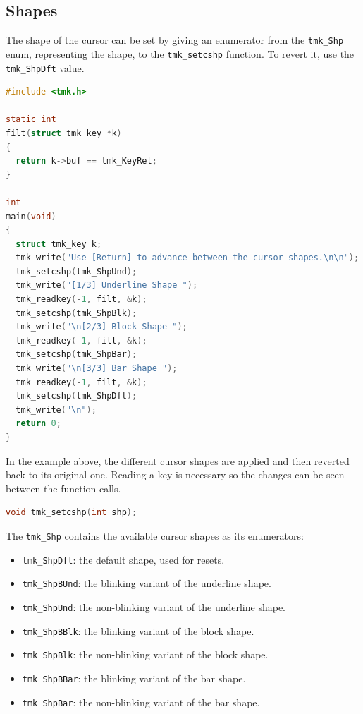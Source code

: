 \documentclass{report}
\begin{document}
\subsection{Shapes}
The shape of the cursor can be set by giving an enumerator from the \texttt{tmk\_Shp} enum, representing the shape, to the \texttt{tmk\_setcshp} function. To revert it, use the \texttt{tmk\_ShpDft} value.
\begin{lstlisting}[language=c,caption=an example that sets cursor shapes.]
#include <tmk.h>

static int
filt(struct tmk_key *k)
{
  return k->buf == tmk_KeyRet;
}

int
main(void)
{
  struct tmk_key k;
  tmk_write("Use [Return] to advance between the cursor shapes.\n\n");
  tmk_setcshp(tmk_ShpUnd);
  tmk_write("[1/3] Underline Shape ");
  tmk_readkey(-1, filt, &k);
  tmk_setcshp(tmk_ShpBlk);
  tmk_write("\n[2/3] Block Shape ");
  tmk_readkey(-1, filt, &k);
  tmk_setcshp(tmk_ShpBar);
  tmk_write("\n[3/3] Bar Shape ");
  tmk_readkey(-1, filt, &k);
  tmk_setcshp(tmk_ShpDft);
  tmk_write("\n");
  return 0;
}
\end{lstlisting}
In the example above, the different cursor shapes are applied and then reverted back to its original one. Reading a key is necessary so the changes can be seen between the function calls.
\begin{lstlisting}[language=c,caption=the declaration of the \texttt{tmk\_setcshp} function.]
void tmk_setcshp(int shp);
\end{lstlisting}

The \texttt{tmk\_Shp} contains the available cursor shapes as its enumerators:

\begin{itemize}
  \item \texttt{tmk\_ShpDft}: the default shape, used for resets.
  \item \texttt{tmk\_ShpBUnd}: the blinking variant of the underline shape.
  \item \texttt{tmk\_ShpUnd}: the non-blinking variant of the underline shape.
  \item \texttt{tmk\_ShpBBlk}: the blinking variant of the block shape.
  \item \texttt{tmk\_ShpBlk}: the non-blinking variant of the block shape.
  \item \texttt{tmk\_ShpBBar}: the blinking variant of the bar shape.
  \item \texttt{tmk\_ShpBar}: the non-blinking variant of the bar shape.
\end{itemize}
\end{document}
